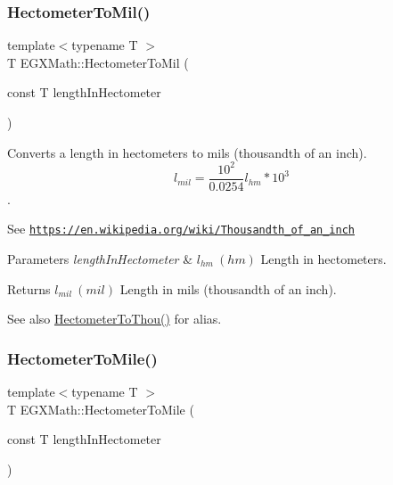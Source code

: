 \subsubsection{\texorpdfstring{Hectometer\+To\+Mil()}{HectometerToMil()}}
{\footnotesize\ttfamily template$<$typename T $>$ \\
T E\+G\+X\+Math\+::\+Hectometer\+To\+Mil (\begin{DoxyParamCaption}\item[{const T}]{length\+In\+Hectometer }\end{DoxyParamCaption})}



Converts a length in hectometers to mils (thousandth of an inch). \[ l_{mil}= \frac{10^{2}}{0.0254} l_{hm} * 10^{3} \]. 

See \href{https://en.wikipedia.org/wiki/Thousandth_of_an_inch}{\tt https\+://en.\+wikipedia.\+org/wiki/\+Thousandth\+\_\+of\+\_\+an\+\_\+inch} 
\begin{DoxyParams}{Parameters}
{\em length\+In\+Hectometer} & $ l_{hm}\ (hm)$ Length in hectometers. \\
\hline
\end{DoxyParams}
\begin{DoxyReturn}{Returns}
$ l_{mil}\ (mil)$ Length in mils (thousandth of an inch). 
\end{DoxyReturn}
\begin{DoxySeeAlso}{See also}
\mbox{\hyperlink{group___e_g_x_math-_conversions-_length_conversions-_hectometer-_imperial_gabfd81bd5bb9e8293005c23794f541a1c}{Hectometer\+To\+Thou()}} for alias. 
\end{DoxySeeAlso}
\mbox{\label{group___e_g_x_math-_conversions-_length_conversions-_hectometer-_imperial_gabb3930dfb3335dc53303ec8ce9145d71}} 
\subsubsection{\texorpdfstring{Hectometer\+To\+Mile()}{HectometerToMile()}}
{\footnotesize\ttfamily template$<$typename T $>$ \\
T E\+G\+X\+Math\+::\+Hectometer\+To\+Mile (\begin{DoxyParamCaption}\item[{const T}]{length\+In\+Hectometer }\end{DoxyParamCaption})}



